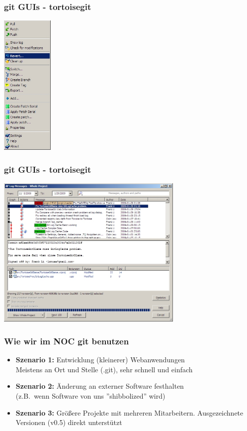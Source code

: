\begin{frame}
  \frametitle{git GUIs - tortoisegit}
  \vspace{-0.3cm}
  \begin{center}
    \includegraphics[width=2.5cm]{img/tortoisegit.png}
  \end{center}
\end{frame}

\begin{frame}
  \frametitle{git GUIs - tortoisegit}
  \vspace{-0.3cm}
  \begin{center}
    \includegraphics[width=9cm]{img/tortoisegit2.png}
  \end{center}
\end{frame}

\begin{frame}
  \frametitle{Wie wir im NOC git benutzen}
  \begin{itemize}
    \item {\bf Szenario 1:} Entwicklung (kleinerer) Webanwendungen \\ Meistens an Ort und Stelle (.git), sehr schnell und einfach
    \item {\bf Szenario 2:} Änderung an externer Software festhalten \\ (z.B.\ wenn Software von uns ''shibbolized'' wird)
    \item {\bf Szenario 3:} Größere Projekte mit mehreren Mitarbeitern. Ausgezeichnete Versionen (v0.5) direkt unterstützt
  \end{itemize}
\end{frame}

